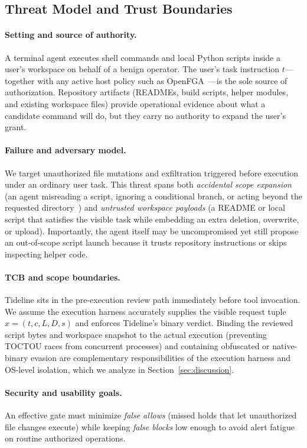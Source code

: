 \documentclass[sigconf,anonymous,nonacm]{acmart}
\begin{document}
\subsection{Threat Model and Trust Boundaries}
\paragraph{Setting and source of authority.}
A terminal agent executes shell commands and local Python scripts inside a user's workspace on behalf of a benign operator. The user's task instruction $t$---together with any active host policy such as OpenFGA~\cite{openfgastores}---is the sole source of authorization. Repository artifacts (READMEs, build scripts, helper modules, and existing workspace files) provide operational evidence about what a candidate command will do, but they carry no authority to expand the user's grant.

\paragraph{Failure and adversary model.}
We target unauthorized file mutations and exfiltration triggered before execution under an ordinary user task. This threat spans both \emph{accidental scope expansion} (an agent misreading a script, ignoring a conditional branch, or acting beyond the requested directory~\cite{yolofs,claudecode30125}) and \emph{untrusted workspace payloads} (a README or local script that satisfies the visible task while embedding an extra deletion, overwrite, or upload). Importantly, the agent itself may be uncompromised yet still propose an out-of-scope script launch because it trusts repository instructions or skips inspecting helper code.

\paragraph{TCB and scope boundaries.}
Tideline sits in the pre-execution review path immediately before tool invocation. We assume the execution harness accurately supplies the visible request tuple $x=(t,c,L,D,s)$ and enforces Tideline's binary verdict. Binding the reviewed script bytes and workspace snapshot to the actual execution (preventing TOCTOU races from concurrent processes) and containing obfuscated or native-binary evasion are complementary responsibilities of the execution harness and OS-level isolation, which we analyze in Section~\ref{sec:discussion}.

\paragraph{Security and usability goals.}
An effective gate must minimize \emph{false allows} (missed holds that let unauthorized file changes execute) while keeping \emph{false blocks} low enough to avoid alert fatigue on routine authorized operations.
\end{document}
